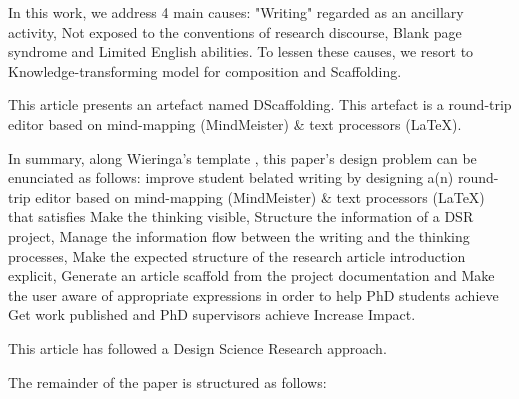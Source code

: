 \documentclass{article}
\newcommand{\todo}[1] {\iffalse #1 \fi} %
\begin{document}
In this work, we address 4 main causes: "Writing" regarded as an ancillary activity, Not exposed to the conventions of research discourse, Blank page syndrome and Limited English abilities. To lessen these causes, we resort to Knowledge-transforming model for composition and Scaffolding. 
\todo{clarificar bien lo que se entiende por ...}
    
This article presents an artefact named DScaffolding. This artefact is a round-trip editor based on mind-mapping (MindMeister) & text processors (LaTeX). 
    
In summary, along Wieringa's template \cite{Wieringa2014}, this paper's design problem can be enunciated as follows: 
improve student belated writing
by designing a(n) round-trip editor based on mind-mapping (MindMeister) & text processors (LaTeX)
that satisfies Make the thinking visible, Structure the information of a DSR project, Manage the information flow between the writing and the thinking processes, Make the expected structure of the research article introduction explicit, Generate an article scaffold from the project documentation and Make the user aware of appropriate expressions
in order to help PhD students achieve Get work published and PhD supervisors achieve Increase Impact. 
    

      
This article has followed a Design Science Research approach.

The remainder of the paper is structured as follows: 

    
      


\end{document}

